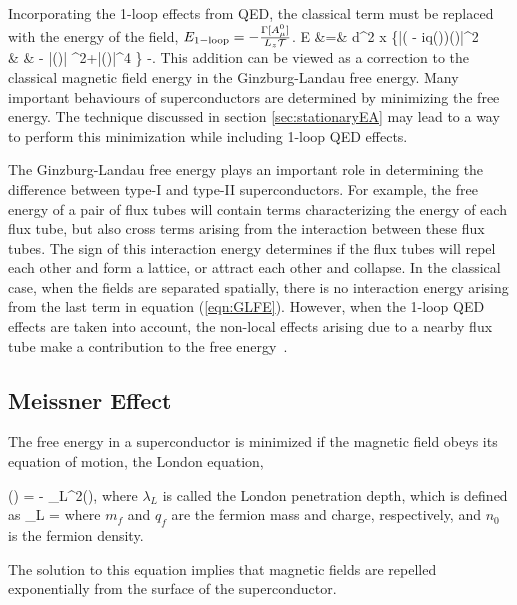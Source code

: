Incorporating the 1-loop effects from \ac{QED}, the classical term 
must be replaced with the energy of the field, 
$E_{\rm 1-loop} = -\frac{\Gamma[A_\mu^0]}{L_z\mathcal{T}}$.
\ba
	E &=& \int d^2 x \biggr\{\left|\left(\vec{\nabla }
		- iq()\right)\psi()\right|^2 \nonumber \\
	 & & - \mu|\psi()| ^2+|\psi()|^4 
	 \biggr\} -.	
\ea
This addition can be viewed as a correction to the classical 
magnetic field energy in the Ginzburg-Landau free energy.
Many important behaviours of superconductors are determined 
by minimizing the free energy. The technique discussed in section 
\ref{sec:stationaryEA} may lead to a way to perform
this minimization while including 1-loop \ac{QED} effects.

The Ginzburg-Landau free energy plays an important role in 
determining the difference between type-I and type-II superconductors.
For example, the free energy of a pair of flux tubes will contain 
terms characterizing the energy of each flux tube, but also 
cross terms arising from the interaction between these flux tubes.
The sign of this interaction energy determines if the flux tubes 
will repel each other and form a lattice, or attract each other and collapse.
In the classical case, when the fields are separated spatially, there 
is no interaction energy arising from the last term in equation (\ref{eqn:GLFE}).
However, when the 1-loop \ac{QED} effects are taken into account, the 
non-local effects arising due to a nearby flux tube make a contribution 
to the free energy~\cite{Langfeld:2002vy}. 

\subsection{Meissner Effect}

The free energy in a superconductor is minimized if the magnetic 
field obeys its equation of motion, the London equation,

\be
	\vec{\nabla} \times \vec{\nabla} \times {}()
	= - \lambda_L^2(),
\ee
where $\lambda_L$ is called the London penetration depth,
which is defined as
\be
	\label{eqn:LondonPD}
	\lambda_L = 
\ee
where $m_f$ and $q_f$ are the fermion mass and charge, 
respectively, and $n_0$ is the fermion density.

The solution to this equation implies that magnetic 
fields are repelled exponentially from the surface
of the superconductor.

